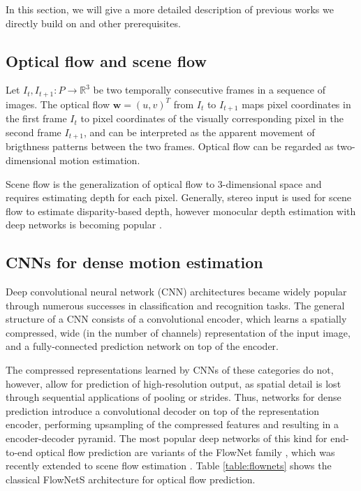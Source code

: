 In this section, we will give a more detailed description of previous works
we directly build on and other prerequisites.

\subsection{Optical flow and scene flow}
Let $I_t,I_{t+1} : P \to \mathbb{R}^3$ be two temporally consecutive frames in a
sequence of images.
The optical flow
$\mathbf{w} = (u, v)^T$ from $I_t$ to $I_{t+1}$
maps pixel coordinates in the first frame $I_t$ to pixel coordinates of the
visually corresponding pixel in the second frame $I_{t+1}$,
and can be interpreted as the apparent movement of brigthness patterns between the two frames.
Optical flow can be regarded as two-dimensional motion estimation.

Scene flow is the generalization of optical flow to 3-dimensional space and
requires estimating depth for each pixel. Generally, stereo input is used for scene flow
to estimate disparity-based depth, however monocular depth estimation with deep networks is becoming
popular \cite{DeeperDepth}.

\subsection{CNNs for dense motion estimation}
Deep convolutional neural network (CNN) architectures
\cite{ImageNetCNN, VGGNet, ResNet}
became widely popular through numerous successes in classification and recognition tasks.
The general structure of a CNN consists of a convolutional encoder, which
learns a spatially compressed, wide (in the number of channels) representation of the input image,
and a fully-connected prediction network on top of the encoder.

The compressed representations learned by CNNs of these categories do not, however, allow
for prediction of high-resolution output, as spatial detail is lost through sequential applications
of pooling or strides.
Thus, networks for dense prediction introduce a convolutional decoder on top of the representation encoder,
performing upsampling of the compressed features and resulting in a encoder-decoder pyramid.
The most popular deep networks of this kind for end-to-end optical flow prediction
are variants of the FlowNet family \cite{FlowNet, FlowNet2},
which was recently extended to scene flow estimation \cite{SceneFlowDataset}.
Table \ref{table:flownets} shows the classical FlowNetS architecture for optical flow prediction.

